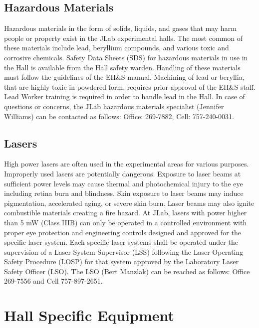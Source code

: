 \section{Hazardous Materials}

	Hazardous materials in the form of solids, liquids, and gases that may harm people 
or property exist in the JLab experimental halls. The most common of these materials include 
lead, beryllium compounds, and various toxic and corrosive chemicals. 
Safety Data Sheets (SDS) for hazardous materials 
in use in the Hall is available from the Hall safety warden.  
Handling of these materials 
must follow the guidelines of the EH\&S manual. Machining of lead or beryllia, that 
are highly toxic in powdered form, requires prior approval of the EH\&S staff. 
Lead Worker training is required in order to handle lead in the Hall. 
In case of questions or concerns, the JLab hazardous materials specialist (Jennifer Williams) 
can be contacted as follows: Office: 269-7882, Cell: 757-240-0031.

\section{Lasers}

	High power lasers are often used in the experimental areas for various purposes. Improperly 
used lasers are potentially dangerous. Exposure to laser beams at sufficient power levels 
may cause thermal and photochemical injury to the eye including retina burn and blindness. 
Skin exposure to laser beams may induce pigmentation, accelerated aging, or severe skin burn. 
Laser beams may also ignite combustible materials creating a fire hazard. At JLab, lasers with power 
higher than 5 mW (Class IIIB) can only be operated in a controlled environment with proper eye protection 
and engineering controls designed and approved for the specific laser system. Each specific laser systems 
shall be operated under the supervision of a Laser System Supervisor (LSS) following the Laser 
Operating Safety Procedure (LOSP) for that system approved by the Laboratory Laser Safety Officer (LSO). 
The LSO (Bert Manzlak) can be reached as follows: Office 269-7556 and Cell 757-897-2651.

%
%
\chapter{Hall Specific Equipment}

